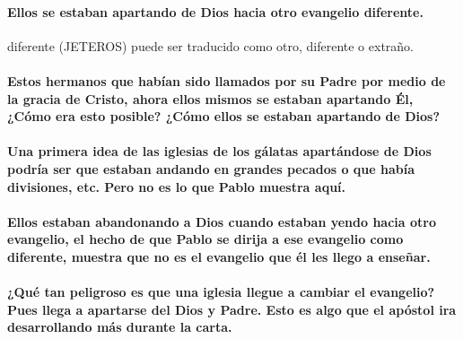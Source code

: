 \documentclass[11a pt,twoside]{article}
\let\oldparagraph\paragraph
\renewcommand{\paragraph}{\needspace{3\baselineskip}\oldparagraph}
\begin{document}
\paragraph{Ellos se estaban apartando de Dios hacia otro evangelio
diferente.}\label{ellos-se-estaban-apartando-de-dios-hacia-otro-evangelio-diferente.}

\begin{center}
\begin{definitionbox}{diferente (JETEROS)}
puede ser traducido como otro, diferente o extraño.
\end{definitionbox}
\end{center}

\paragraph{Estos hermanos que habían sido llamados por su Padre por
medio de la gracia de Cristo, ahora ellos mismos se estaban apartando
Él, ¿Cómo era esto posible? ¿Cómo ellos se estaban apartando de
Dios?}\label{estos-hermanos-que-habuxedan-sido-llamados-por-su-padre-por-medio-de-la-gracia-de-cristo-ahora-ellos-mismos-se-estaban-apartando-uxe9l-cuxf3mo-era-esto-posible-cuxf3mo-ellos-se-estaban-apartando-de-dios}

\paragraph{Una primera idea de las iglesias de los gálatas apartándose
de Dios podría ser que estaban andando en grandes pecados o que había
divisiones, etc. Pero no es lo que Pablo muestra
aquí.}\label{una-primera-idea-de-las-iglesias-de-los-guxe1latas-apartuxe1ndose-de-dios-podruxeda-ser-que-estaban-andando-en-grandes-pecados-o-que-habuxeda-divisiones-etc.-pero-no-es-lo-que-pablo-muestra-aquuxed.}

\paragraph{Ellos estaban abandonando a Dios cuando estaban yendo hacia
otro evangelio, el hecho de que Pablo se dirija a ese evangelio como
diferente, muestra que no es el evangelio que él les llego a
enseñar.}\label{ellos-estaban-abandonando-a-dios-cuando-estaban-yendo-hacia-otro-evangelio-el-hecho-de-que-pablo-se-dirija-a-ese-evangelio-como-diferente-muestra-que-no-es-el-evangelio-que-uxe9l-les-llego-a-enseuxf1ar.}

\paragraph{¿Qué tan peligroso es que una iglesia llegue a cambiar el
evangelio? Pues llega a apartarse del Dios y Padre. Esto es algo que el
apóstol ira desarrollando más durante la
carta.}\label{quuxe9-tan-peligroso-es-que-una-iglesia-llegue-a-cambiar-el-evangelio-pues-llega-a-apartarse-del-dios-y-padre.-esto-es-algo-que-el-apuxf3stol-ira-desarrollando-muxe1s-durante-la-carta.}
\end{document}
